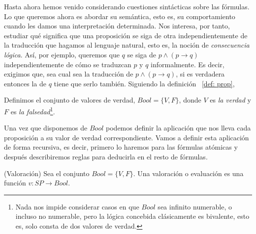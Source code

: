 Hasta ahora hemos venido considerando cuestiones sintácticas sobre las fórmulas. Lo que queremos ahora es abordar su semántica, esto es, su comportamiento cuando les damos una interpretación determinada. Nos interesa, por tanto, estudiar qué significa que una proposición se siga de otra independientemente de la traducción que hagamos al lenguaje natural, esto es, la noción de \textit{consecuencia lógica}. Así, por ejemplo, queremos que $q$ se siga de $p \land (p \rightarrow q)$ independientemente de cómo se traduzcan $p$ y $q$ informalmente. Es decir, exigimos que, sea cual sea la traducción de $p \land (p \rightarrow q)$, si es verdadera entonces la de $q$ tiene que serlo también.  Siguiendo la definición ~\ref{def: prop}, 

\begin{definition}
Definimos el conjunto de valores de verdad, $Bool = \{V, F\}$, donde $V$ es \textit{la verdad} y $F$ es \textit{la falsedad}\footnote{Nada nos impide considerar casos en que $Bool$ sea infinito numerable, o incluso no numerable, pero la lógica concebida clásicamente es bivalente, esto es, solo consta de dos valores de verdad.}.
\end{definition}

Una vez que disponemos de $Bool$ podemos definir la aplicación que nos lleva cada proposición a su valor de verdad correspondiente. Vamos a definir esta aplicación de forma recursiva, es decir, primero lo haremos para las fórmulas atómicas y después describiremos reglas para deducirla en el resto de fórmulas.

\begin{definition}(Valoración) Sea el conjunto $Bool = \{V, F\}$. Una valoración o evaluación es una función $v: SP \rightarrow Bool$. 
\end{definition}

